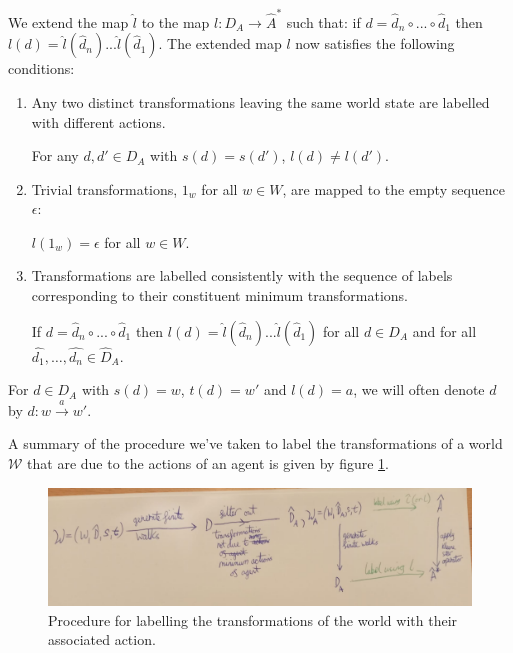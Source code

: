 We extend the map $\hat{l}$ to the map $l: D_{A} \to \hat{A}^{\ast}$ such that:
if $d = \hat{d}_{n} \circ ... \circ \hat{d}_{1}$ then $l(d) = \hat{l}(\hat{d}_{n}) ... \hat{l}(\hat{d}_{1})$.
The extended map $l$ now satisfies the following conditions:
\begin{enumerate}
	\item Any two distinct transformations leaving the same world state are
	      labelled with different actions.
	      \begin{action_condition}[Uniqueness]\label{actcon:action_gives_single_outcome}
		      For any $d,d' \in D_{A}$ with $s(d)=s(d')$, $l(d) \neq l(d')$.
	      \end{action_condition}

	\item Trivial transformations, $1_{w}$ for all $w \in W$, are mapped to the empty sequence $\epsilon$:
	      \begin{action_condition}[Identity]\label{actcon:trivial_transformations_mapped_to_empty_sequence}
		      $l(1_{w}) = \epsilon$ for all $w \in W$.
	      \end{action_condition}

	\item Transformations are labelled consistently with the sequence of labels corresponding to their constituent minimum transformations.
	      \begin{action_condition}\label{actcon:composition_consistency}
		      If $d = \hat{d}_{n} \circ ... \circ \hat{d}_{1}$ then $l(d) = \hat{l}(\hat{d}_{n}) ... \hat{l}(\hat{d}_{1})$ for all $d \in D_{A}$ and for all $\hat{d_{1}}, \dots , \hat{d_{n}} \in \hat{D}_{A}$.
	      \end{action_condition}
\end{enumerate}

For $d \in D_{A}$ with $s(d) = w$, $t(d) = w'$ and $l(d) = a$, we will often denote $d$ by $d: w \xrightarrow{a} w'$.

A summary of the procedure we've taken to label the transformations of a world $\mathscr{W}$ that are due to the actions of an agent is given by figure \ref{fig:action_labelling_procedure}.

\begin{figure}
	\centering
	\includegraphics[width=\linewidth]{2MathematicalFramework/Images/action_labelling_procedure.jpeg}
	\caption{Procedure for labelling the transformations of the world with their associated action.}
	\label{fig:action_labelling_procedure}
\end{figure}


